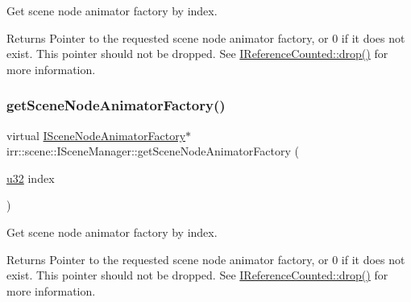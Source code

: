 Get scene node animator factory by index. 

\begin{DoxyReturn}{Returns}
Pointer to the requested scene node animator factory, or 0 if it does not exist. This pointer should not be dropped. See \hyperlink{classirr_1_1IReferenceCounted_a03856a09355b89d178090c4a5f738543}{I\+Reference\+Counted\+::drop()} for more information. 
\end{DoxyReturn}
\mbox{\label{classirr_1_1scene_1_1ISceneManager_a96d8272b74bd0adc9138f17e832dc887}} 
\subsubsection{\texorpdfstring{get\+Scene\+Node\+Animator\+Factory()}{getSceneNodeAnimatorFactory()}\hspace{0.1cm}{\footnotesize\ttfamily [2/2]}}
{\footnotesize\ttfamily virtual \hyperlink{classirr_1_1scene_1_1ISceneNodeAnimatorFactory}{I\+Scene\+Node\+Animator\+Factory}$\ast$ irr\+::scene\+::\+I\+Scene\+Manager\+::get\+Scene\+Node\+Animator\+Factory (\begin{DoxyParamCaption}\item[{\hyperlink{namespaceirr_a0416a53257075833e7002efd0a18e804}{u32}}]{index }\end{DoxyParamCaption})\hspace{0.3cm}{\ttfamily [pure virtual]}}



Get scene node animator factory by index. 

\begin{DoxyReturn}{Returns}
Pointer to the requested scene node animator factory, or 0 if it does not exist. This pointer should not be dropped. See \hyperlink{classirr_1_1IReferenceCounted_a03856a09355b89d178090c4a5f738543}{I\+Reference\+Counted\+::drop()} for more information. 
\end{DoxyReturn}
\mbox{\label{classirr_1_1scene_1_1ISceneManager_ac912b9effd5ce46f5dc038e0568e614c}} 
